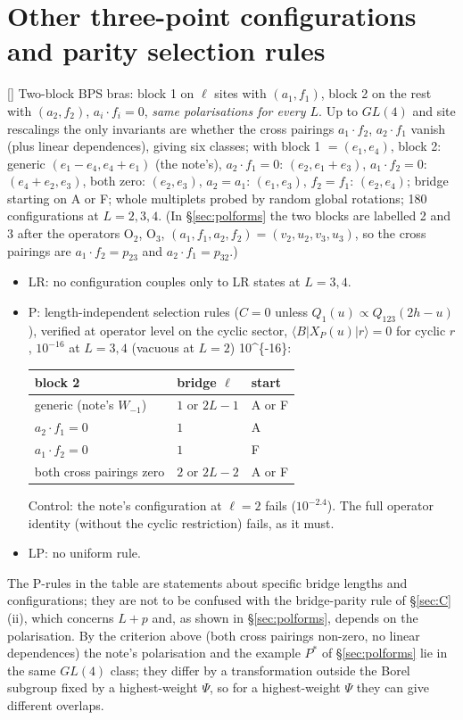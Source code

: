 \section{Other three-point configurations and parity selection rules}\label{sec:configs}

[] Two-block BPS bras: block 1 on $\ell$ sites with $(a_1,f_1)$, block 2 on the rest with
$(a_2,f_2)$, $a_i\cdot f_i=0$, \emph{same polarisations for every $L$}. Up to $GL(4)$ and site rescalings the only
invariants are whether the cross pairings $a_1\cdot f_2$, $a_2\cdot f_1$ vanish (plus linear dependences), giving six
classes; with block 1 $=(e_1,e_4)$, block 2: generic $(e_1-e_4,e_4+e_1)$ (the note's), $a_2\cdot f_1=0$: $(e_2,e_1+e_3)$,
$a_1\cdot f_2=0$: $(e_4+e_2,e_3)$, both zero: $(e_2,e_3)$, $a_2=a_1$: $(e_1,e_3)$, $f_2=f_1$: $(e_2,e_4)$; bridge starting on A or
F; whole multiplets probed by random global rotations; 180 configurations at $L=2,3,4$. (In \S\ref{sec:polforms} the two blocks are labelled 2 and 3 after the operators O$_2$, O$_3$,
$(a_1,f_1,a_2,f_2)=(v_2,u_2,v_3,u_3)$, so the cross pairings are $a_1\cdot f_2=p_{23}$ and $a_2\cdot f_1=p_{32}$.)
\begin{itemize}
\item LR: no configuration couples only to LR states at $L=3,4$.
\item P: length-independent selection rules ($C=0$ unless $Q_1(u)\propto Q_{123}(2h-u)$), verified at operator level on the
cyclic sector, $\langle B|X_P(u)|r\rangle=0$ for cyclic $r$, $10^{-16}$ at $L=3,4$ (vacuous at $L=2$) \num{10^{-16}}:
\begin{center}
\begin{tabular}{lll}
\toprule
block 2 & bridge $\ell$ & start\\
\midrule
generic (note's $W_{-1}$) & $1$ or $2L-1$ & A or F\\
$a_2\cdot f_1=0$ & $1$ & A\\
$a_1\cdot f_2=0$ & $1$ & F\\
both cross pairings zero & $2$ or $2L-2$ & A or F\\
\bottomrule
\end{tabular}
\end{center}
Control: the note's configuration at $\ell=2$ fails ($10^{-2.4}$). The full operator identity (without the cyclic
restriction) fails, as it must.
\item LP: no uniform rule.
\end{itemize}
The P-rules in the table are statements about specific bridge lengths and configurations; they are not to be confused with the bridge-parity rule of \S\ref{sec:C}(ii), which concerns $L+p$ and, as shown in \S\ref{sec:polforms}, depends on the polarisation.
By the criterion above (both cross pairings non-zero, no linear dependences) the note's polarisation and the example $P^*$ of \S\ref{sec:polforms} lie in the same $GL(4)$ class; they differ by a transformation
outside the Borel subgroup fixed by a highest-weight $\Psi$, so for a highest-weight $\Psi$ they can give different overlaps.

